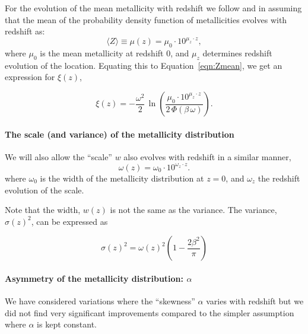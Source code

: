 \documentclass[twocolumn]{aastex631}
\begin{document}
\noindent For the evolution of the mean metallicity with redshift we follow \cite{Neijssel+2019} and \cite{Langer2006} in assuming that the mean of the probability density function of metallicities evolves with redshift as:
\begin{equation}
\label{eq: mean Z}
    \langle Z \rangle \equiv \mu(z) = \mu_0 \cdot 10^{\mu_z \cdot z},
\end{equation}
where $\mu_0
$ is the mean metallicity at redshift 0, and $\mu_z
$ determines redshift evolution of the location. Equating this to Equation~\ref{eqn:Zmean}, we get an expression for $\xi(z)$,

\begin{equation}
\label{eq mu z}
    \xi(z) = -\frac{\omega^2}{2}\, \ln\left(\frac{  \mu_0 \cdot 10^{\mu_z \cdot z} }{2\, \Phi(\beta\, \omega)}  \right).
\end{equation}

\paragraph{The scale (and variance) of the metallicity distribution}

We will also allow the ``scale'' $w$ also evolves with redshift in a similar manner, 
\begin{equation}
\label{eq: sigma z}
    \omega(z) = \omega_0 \cdot 10^{\omega_z \cdot z}.
\end{equation}
where $\omega_0$ is
the width of the metallicity distribution at $z=0$, and $\omega_z$
the redshift evolution of the scale.

Note that the width, $w(z)$ is not the same as the variance. The variance, $\sigma(z)^2$, can be expressed as

\begin{equation}
    \sigma(z)^2 = \omega(z)^2 \left( 1 - \frac{2\beta^2}{\pi} \right)
\end{equation}

\paragraph{Asymmetry of the metallicity distribution: $\alpha$}
We have considered variations where the ``skewness'' $\alpha$ varies with redshift but we did not find very significant improvements compared to the simpler assumption where $\alpha$ is kept constant. 


\end{document}
